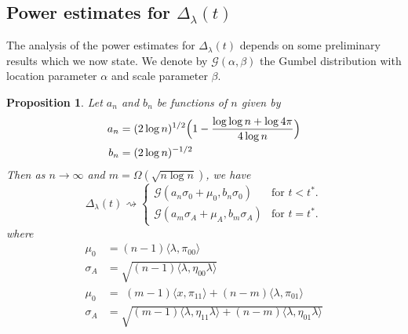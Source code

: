 \documentclass[final]{IEEEtran}
\newtheorem{proposition}[theorem]{Proposition}
\theoremstyle{definition}
\begin{document}
\subsection{Power estimates for $\Delta_{\lambda}(t)$}
\label{sec:power-estim-delt}
The analysis of the power estimates for $\Delta_{\lambda}(t)$ depends
on some preliminary results which we now state. We denote by
$\mathcal{G}(\alpha, \beta)$ the Gumbel distribution with location
parameter $\alpha$ and scale parameter $\beta$.  
\begin{proposition}
  \label{prop:3}
  Let $a_n$ and $b_n$ be functions of $n$ given by
  \begin{align*}
    a_n &= (2 \log{n})^{1/2}\Bigl(1 - \frac{\log{\log{n}} + \log{4\pi}}{4 \log{n}} \Bigr) \\ 
    b_n &= (2 \log{n})^{-1/2}
  \end{align*}
  Then as $n \rightarrow \infty$ and $m = \Omega( \sqrt{n \log{n}})$,
  we have
  \begin{equation}
    \label{eq:14}
    \Delta_{\lambda}(t) \rightsquigarrow \begin{cases}
      \mathcal{G}(a_n \sigma_0 + \mu_0, b_n \sigma_0 ) & \text{for $t < t^{*}$.} \\
     \mathcal{G}(a_m \sigma_A + \mu_A, b_m \sigma_A) &
     \text{for $t = t^{*}$.}
     \end{cases}
  \end{equation}
  where
  \begin{align*}
    \mu_0 &= (n-1)\langle \lambda, \pi_{00} \rangle \\
    \sigma_A &= \sqrt{(n-1)\langle \lambda, \eta_{00} \lambda \rangle} \\
    \mu_0 &= \,\, (m - 1) \langle x, \pi_{11} \rangle + (n-
    m)\langle \lambda, \pi_{01} \rangle
    \\ \sigma_A &= \sqrt{ (m - 1) \langle \lambda, \eta_{11} \lambda \rangle + (n -
      m) \langle \lambda, \eta_{01} \lambda \rangle}
    \end{align*}
\end{proposition}
\end{document}
